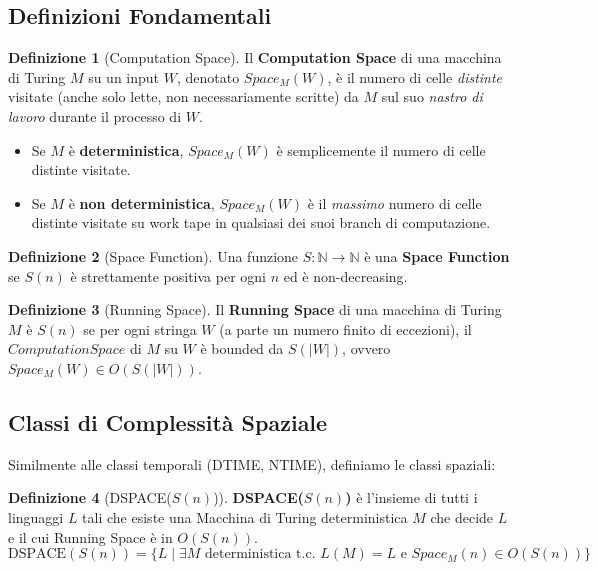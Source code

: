 \documentclass[a4paper]{article}
\theoremstyle{definition} %
\newtheorem{definition}{Definizione}[section]
\begin{document}
\subsection{Definizioni Fondamentali}

\begin{definition}[Computation Space]
Il \textbf{Computation Space} di una macchina di Turing $M$ su un input $W$, denotato $Space_M(W)$, è il numero di celle \emph{distinte} visitate (anche solo lette, non necessariamente scritte) da $M$ sul suo \emph{nastro di lavoro} durante il processo di $W$.
\begin{itemize}
    \item Se $M$ è \textbf{deterministica}, $Space_M(W)$ è semplicemente il numero di celle distinte visitate.
    \item Se $M$ è \textbf{non deterministica}, $Space_M(W)$ è il \emph{massimo} numero di celle distinte visitate su work tape in qualsiasi dei suoi branch di computazione.
\end{itemize}
\end{definition}

\begin{definition}[Space Function]
Una funzione $S: \mathbb{N} \to \mathbb{N}$ è una \textbf{Space Function} se $S(n)$ è strettamente positiva per ogni $n$ ed è non-decreasing.
\end{definition}

\begin{definition}[Running Space]
Il \textbf{Running Space} di una macchina di Turing $M$ è $S(n)$ se per ogni stringa $W$ (a parte un numero finito di eccezioni), il $Computation Space$ di $M$ su $W$ è bounded da $S(|W|)$, ovvero $Space_M(W) \in O(S(|W|))$.
\end{definition}

\subsection{Classi di Complessità Spaziale}

Similmente alle classi temporali (DTIME, NTIME), definiamo le classi spaziali:

\begin{definition}[DSPACE($S(n)$)]
\textbf{DSPACE($S(n)$)} è l'insieme di tutti i linguaggi $L$ tali che esiste una Macchina di Turing deterministica $M$ che decide $L$ e il cui Running Space è in $O(S(n))$.
\[ \text{DSPACE}(S(n)) = \{ L \mid \exists M \text{ deterministica t.c. } L(M) = L \text{ e } Space_M(n) \in O(S(n)) \} \]
\end{definition}
\end{document}

